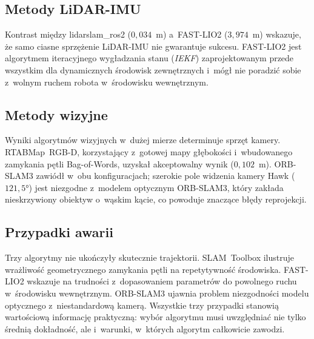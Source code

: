 \subsection{Metody LiDAR-IMU}

Kontrast między lidarslam\_ros2 ($0{,}034$~m) a~FAST-LIO2 ($3{,}974$~m)
wskazuje, że samo ciasne sprzężenie LiDAR-IMU nie gwarantuje sukcesu.
FAST-LIO2 jest algorytmem iteracyjnego wygładzania stanu (\textit{IEKF})
zaprojektowanym przede wszystkim dla dynamicznych środowisk zewnętrznych
i~mógł nie poradzić sobie z~wolnym ruchem robota w~środowisku wewnętrznym.

\subsection{Metody wizyjne}

Wyniki algorytmów wizyjnych w~dużej mierze determinuje sprzęt kamery.
RTABMap~RGB-D, korzystający z~gotowej mapy głębokości i~wbudowanego zamykania
pętli Bag-of-Words, uzyskał akceptowalny wynik ($0{,}102$~m).
ORB-SLAM3 zawiódł w~obu konfiguracjach; szerokie pole widzenia kamery Hawk
($121{,}5°$) jest niezgodne z~modelem optycznym ORB-SLAM3, który zakłada
nieskrzywiony obiektyw o~wąskim kącie, co powoduje znaczące błędy reprojekcji.

\subsection{Przypadki awarii}

Trzy algorytmy nie ukończyły skutecznie trajektorii.
SLAM~Toolbox ilustruje wrażliwość geometrycznego zamykania pętli na
repetytywność środowiska.
FAST-LIO2 wskazuje na trudności z~dopasowaniem parametrów do powolnego ruchu
w~środowisku wewnętrznym.
ORB-SLAM3 ujawnia problem niezgodności modelu optycznego z~niestandardową kamerą.
Wszystkie trzy przypadki stanowią wartościową informację praktyczną: wybór
algorytmu musi uwzględniać nie tylko średnią dokładność, ale i~warunki,
w~których algorytm całkowicie zawodzi.
